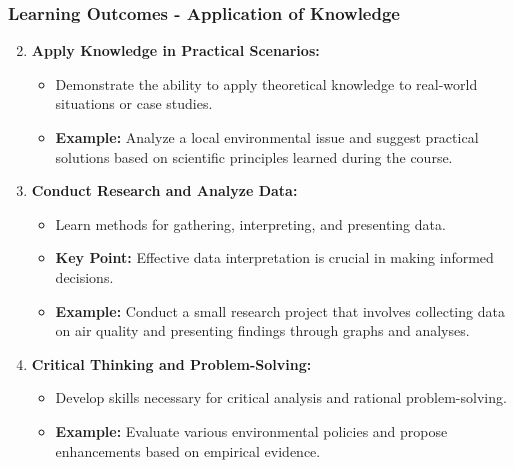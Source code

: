\documentclass[aspectratio=169]{beamer}
\begin{document}
\begin{frame}[fragile]
    \frametitle{Learning Outcomes - Application of Knowledge}
    \begin{enumerate}
        \setcounter{enumi}{1} %
        \item \textbf{Apply Knowledge in Practical Scenarios:}
        \begin{itemize}
            \item Demonstrate the ability to apply theoretical knowledge to real-world situations or case studies.
            \item \textbf{Example:} Analyze a local environmental issue and suggest practical solutions based on scientific principles learned during the course.
        \end{itemize}

        \item \textbf{Conduct Research and Analyze Data:}
        \begin{itemize}
            \item Learn methods for gathering, interpreting, and presenting data.
            \item \textbf{Key Point:} Effective data interpretation is crucial in making informed decisions. 
            \item \textbf{Example:} Conduct a small research project that involves collecting data on air quality and presenting findings through graphs and analyses.
        \end{itemize}

        \item \textbf{Critical Thinking and Problem-Solving:}
        \begin{itemize}
            \item Develop skills necessary for critical analysis and rational problem-solving.
            \item \textbf{Example:} Evaluate various environmental policies and propose enhancements based on empirical evidence.
        \end{itemize}
    \end{enumerate}
\end{frame}
\end{document}
